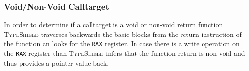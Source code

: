 \subsubsection{Void/Non-Void Calltarget}
In order to determine if a calltarget is a void or non-void return function
\textsc{TypeShield} traverses backwards the basic blocks from the return instruction of the function an looks for the \texttt{RAX} register.
In case  there is a write operation on the \texttt{RAX} register than \textsc{TypeShield}
infers that the function return is non-void and thus provides a pointer value back.

% 
